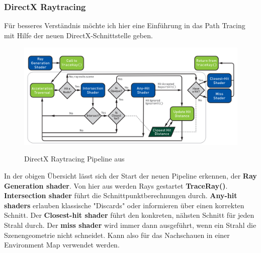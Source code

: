 \subsubsection{DirectX Raytracing}
Für besseres Verständnis möchte ich hier eine Einführung in das Path Tracing\cite{Benty18} mit Hilfe der
neuen DirectX-Schnittstelle geben.
\begin{figure}[H]
    \centering
    \includegraphics[width=\linewidth]{content/PathTracer/Bilder/DirectXRaytracingPipeline.png}
    \label{pic::DirectXRaytracingPipeline}
    \caption{DirectX Raytracing Pipeline aus \cite{Haines2019}}
\end{figure}

In der obigen Übersicht lässt sich der Start der neuen Pipeline erkennen, der \textbf{Ray Generation
shader}. Von hier aus werden Rays gestartet \textbf{TraceRay()}.
\textbf{Intersection shader} führt die Schnittpunktberechnungen durch.
\textbf{Any-hit shaders} erlauben klassische "Discards" oder informieren
über einen korrekten Schnitt. Der \textbf{Closest-hit shader} führt den
konkreten, nähsten Schnitt für jeden Strahl durch.
Der \textbf{miss shader} wird immer dann ausgeführt, wenn ein Strahl die
Szenengeometrie nicht schneidet. Kann also für das Nachschauen in einer 
Environment Map verwendet werden.





